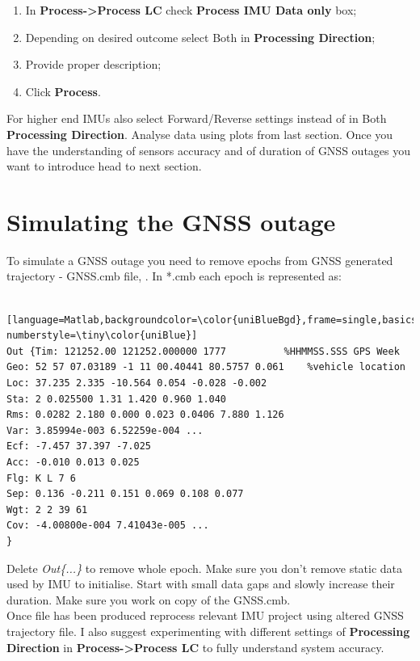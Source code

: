 \documentclass[11pt,fleqn]{book} %
\begin{document}
\begin{enumerate}
	\item In \textbf{Process->Process LC} check \textbf{Process IMU Data only} box;
	\item Depending on desired outcome select Both in \textbf{Processing Direction};
	\item Provide proper description;
	\item Click \textbf{Process}.
\end{enumerate}

\vspace{2cm}
For higher end IMUs also select Forward/Reverse settings instead of in Both \textbf{Processing Direction}. Analyse data using plots from last section. Once you have the understanding of sensors accuracy and of duration of GNSS outages you want to introduce head to next section.


\chapter{Simulating the GNSS outage\label{sec:Simulating-GNSS-outage}}

To simulate a GNSS outage you need to remove epochs from GNSS generated trajectory - GNSS.cmb file, . In {*}.cmb each epoch is represented as:
\bigskip
\begin{lstlisting} [language=Matlab,backgroundcolor=\color{uniBlueBgd},frame=single,basicstyle=\footnotesize,numbers=left,numbersep=5pt, numberstyle=\tiny\color{uniBlue}]
Out {Tim: 121252.00 121252.000000 1777 			%HHMMSS.SSS GPS Week
Geo: 52 57 07.03189 -1 11 00.40441 80.5757 0.061 	%vehicle location
Loc: 37.235 2.335 -10.564 0.054 -0.028 -0.002 	
Sta: 2 0.025500 1.31 1.420 0.960 1.040 	
Rms: 0.0282 2.180 0.000 0.023 0.0406 7.880 1.126 	
Var: 3.85994e-003 6.52259e-004 ...	
Ecf: -7.457 37.397 -7.025 	
Acc: -0.010 0.013 0.025 	
Flg: K L 7 6 	
Sep: 0.136 -0.211 0.151 0.069 0.108 0.077 	
Wgt: 2 2 39 61 	
Cov: -4.00800e-004 7.41043e-005 ...
}
\end{lstlisting}

\bigskip
Delete \emph{Out\{...\}} to remove whole epoch. Make sure you don't remove static data used by IMU to initialise. Start with small data gaps and slowly increase their duration. Make sure you work on copy of the GNSS.cmb.\\

Once file has been produced reprocess relevant IMU project using altered GNSS trajectory file. I also suggest experimenting with different settings of \textbf{Processing Direction} in \textbf{Process->Process LC} to fully understand system accuracy.
\end{document}
